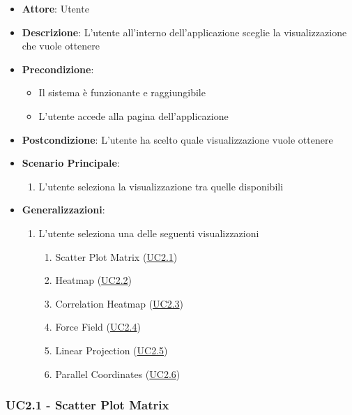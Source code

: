     \begin{itemize}
    \item \textbf{Attore}: Utente
    \item \textbf{Descrizione}: L'utente all'interno dell'applicazione sceglie la visualizzazione che vuole ottenere
    \item \textbf{Precondizione}:
    \begin{itemize}
        \item Il sistema è funzionante e raggiungibile
        \item L'utente accede alla pagina dell'applicazione
    \end{itemize}
    \item \textbf{Postcondizione}: L'utente ha scelto quale visualizzazione vuole ottenere
    \item \textbf{Scenario Principale}: 
        \begin{enumerate}
            \item L'utente seleziona la visualizzazione tra quelle disponibili
        \end{enumerate}  
    \item \textbf{Generalizzazioni}:
        \begin{enumerate}
            \item L'utente seleziona una delle seguenti visualizzazioni
                \begin{enumerate}
                    \item Scatter Plot Matrix (\hyperref[uc2.1]{UC2.1})
                    \item Heatmap (\hyperref[uc2.2]{UC2.2})
                    \item Correlation Heatmap (\hyperref[uc2.3]{UC2.3})
                    \item Force Field (\hyperref[uc2.4]{UC2.4})
                    \item Linear Projection (\hyperref[uc2.5]{UC2.5})
                    \item Parallel Coordinates (\hyperref[uc2.6]{UC2.6})
                \end{enumerate}
        \end{enumerate}  
    \end{itemize}
    
    \subsubsection{UC2.1 - Scatter Plot Matrix}
    \label{uc2.1}
    
